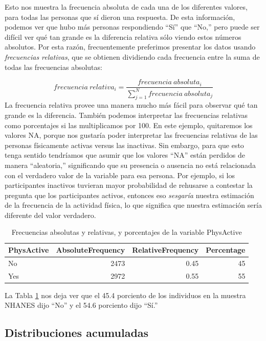 \documentclass[
  12pt,
]{book}
\begin{document}
Esto nos muestra la frecuencia absoluta de cada una de los diferentes valores, para todas las personas que sí dieron una respuesta. De esta información, podemos ver que hubo más personas respondiendo ``Sí'' que ``No,'' pero puede ser difícil ver qué tan grande es la diferencia relativa sólo viendo estos números absolutos. Por esta razón, frecuentemente preferimos presentar los datos usando \emph{frecuencias relativas}, que se obtienen dividiendo cada frecuencia entre la suma de todas las frecuencias absolutas:

\[
frecuencia\ relativa_i = \frac{frecuencia\ absoluta_i}{\sum_{j=1}^N frecuencia\ absoluta_j}
\]
La frecuencia relativa provee una manera mucho más fácil para observar qué tan grande es la diferencia. También podemos interpretar las frecuencias relativas como porcentajes si las multiplicamos por 100. En este ejemplo, quitaremos los valores NA, porque nos gustaría poder interpretar las frecuencias relativas de las personas físicamente activas versus las inactivas. Sin embargo, para que esto tenga sentido tendríamos que asumir que los valores ``NA'' están perdidos de manera ``aleatoria,'' significando que su presencia o ausencia no está relacionada con el verdadero valor de la variable para esa persona. Por ejemplo, si los participantes inactivos tuvieran mayor probabilidad de rehusarse a contestar la pregunta que los participantes activos, entonces eso \emph{sesgaría} nuestra estimación de la frecuencia de la actividad física, lo que significa que nuestra estimación sería diferente del valor verdadero.

\begin{table}

\caption{\label{tab:PhysActiveTableFiltered}Frecuencias absolutas y relativas, y porcentajes de la variable PhysActive}
\centering
\begin{tabular}[t]{l|r|r|r}
\hline
PhysActive & AbsoluteFrequency & RelativeFrequency & Percentage\\
\hline
No & 2473 & 0.45 & 45\\
\hline
Yes & 2972 & 0.55 & 55\\
\hline
\end{tabular}
\end{table}

La Tabla \ref{tab:PhysActiveTableFiltered} nos deja ver que el 45.4 porciento de los individuos en la muestra NHANES dijo ``No'' y el 54.6 porciento dijo ``Sí.''

\hypertarget{cumulative-distributions}{%
\subsection{Distribuciones acumuladas}\label{cumulative-distributions}}
\end{document}
